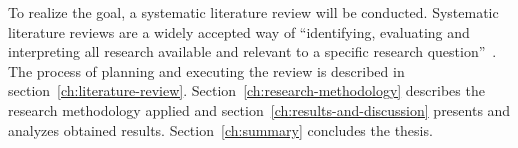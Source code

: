 To realize the goal, a systematic literature review will be conducted.
Systematic literature reviews are a widely accepted way of \enquote{identifying, evaluating and interpreting all research available and relevant to a specific research question}~\cite{kitchenham_guidelines_2007}.
The process of planning and executing the review is described in section~\ref{ch:literature-review}.
Section~\ref{ch:research-methodology} describes the research methodology applied and section~\ref{ch:results-and-discussion} presents and analyzes obtained results.
Section~\ref{ch:summary} concludes the thesis.
